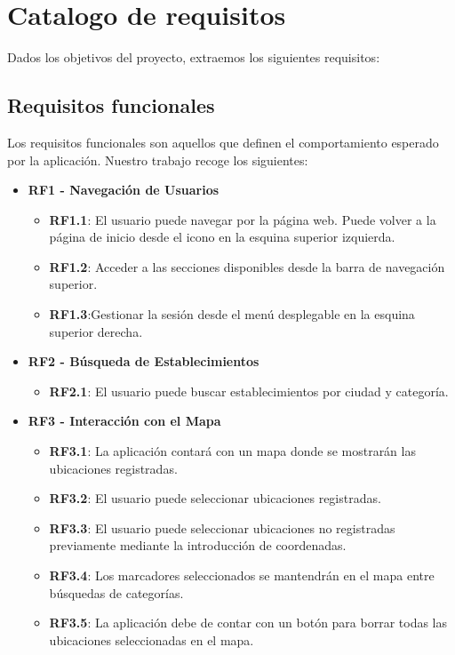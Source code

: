 \section{Catalogo de requisitos}

Dados los objetivos del proyecto, extraemos los siguientes requisitos:

\subsection{Requisitos funcionales}

Los requisitos funcionales son aquellos que definen el comportamiento esperado por la aplicación. Nuestro trabajo recoge los siguientes:

\begin{itemize}
	\item \textbf{RF1 - Navegación de Usuarios}
		\begin{itemize}
  			\item \textbf{RF1.1}: El usuario puede navegar por la página web.
			 Puede volver a la página de inicio desde el icono en la esquina superior izquierda.
			\item \textbf{RF1.2}: Acceder a las secciones disponibles desde la barra de navegación superior.
			\item \textbf{RF1.3}:Gestionar la sesión desde el menú desplegable en la esquina superior derecha.
		\end{itemize}
	\item \textbf{RF2 - Búsqueda de Establecimientos}
	\begin{itemize}
		\item \textbf{RF2.1}: El usuario puede buscar establecimientos por ciudad y categoría.
	\end{itemize}
	\item \textbf{RF3 - Interacción con el Mapa}
		\begin{itemize}
			\item \textbf{RF3.1}: La aplicación contará con un mapa donde se mostrarán las ubicaciones registradas.
			\item \textbf{RF3.2}: El usuario puede seleccionar ubicaciones registradas.
			\item \textbf{RF3.3}: El usuario puede seleccionar ubicaciones no registradas previamente mediante la introducción de coordenadas.
			\item \textbf{RF3.4}: Los marcadores seleccionados se mantendrán en el mapa entre búsquedas de categorías.
			\item \textbf{RF3.5}: La aplicación debe de contar con un botón para borrar todas las ubicaciones seleccionadas en el mapa.

\end{itemize}
\end{itemize}
